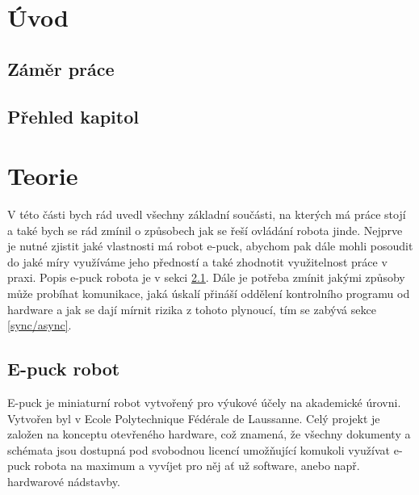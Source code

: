 \documentclass[12pt,notitlepage]{report}
\begin{document}
\newpage


\chapter{Úvod}

    \section{Záměr práce}

    \section{Přehled kapitol}

\chapter{Teorie}

    V této části bych rád uvedl všechny základní součásti, na kterých má práce
    stojí a také bych se rád zmínil o způsobech jak se řeší ovládání robota
    jinde. Nejprve je nutné zjistit jaké vlastnosti má robot e-puck, abychom
    pak dále mohli posoudit do jaké míry využíváme jeho předností a také
    zhodnotit využitelnost práce v praxi. Popis e-puck robota je v sekci
    \ref{e-puck robot}. Dále je potřeba zmínit jakými způsoby může probíhat
    komunikace, jaká úskalí přináší oddělení kontrolního programu od hardware a
    jak se dají mírnit rizika z tohoto plynoucí, tím se zabývá sekce
    \ref{sync/async}.

    \section{E-puck robot}
    \label{e-puck robot}
    E-puck je miniaturní robot vytvořený pro výukové účely na akademické
    úrovni. Vytvořen byl v Ecole Polytechnique Fédérale de Laussanne. Celý
    projekt je založen na konceptu otevřeného hardware, což znamená, že všechny
    dokumenty a schémata jsou dostupná pod svobodnou licencí umožňující
    komukoli využívat e-puck robota na maximum a vyvíjet pro něj ať už
    software, anebo např. hardwarové nádstavby.
\end{document}
